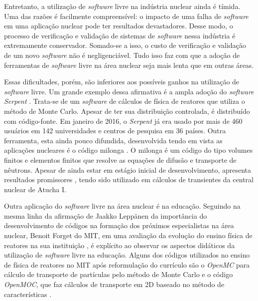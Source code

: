Entretanto, a utilização de \textit{software} livre na indústria nuclear ainda é tímida.
Uma das razões é facilmente compreensível: o impacto de uma falha de \textit{software}
em uma aplicação nuclear pode ter resultados devastadores. Desse modo, o processo de
verificação e validação de sistemas de \textit{software} nessa indústria é extremamente
conservador. Somado-se a isso, o custo de verificação e validação de um novo \textit{software}
não é negligenciável. Tudo isso faz com que a adoção de ferramentas de \textit{software}
livre na área nuclear seja mais lenta que em outras áreas.

Essas dificultades, porém, são inferiores aos possíveis ganhos na utilização de
\textit{software} livre. Um grande exemplo dessa afirmativa é a ampla adoção
do \textit{software Serpent} \cite{Serpent2013}. Trata-se de um \textit{software}
de cálculos de física de reatores que utiliza o método de Monte Carlo. Apesar
de ter sua distribuição controlada, é distribuído com código-fonte. Em janeiro
de 2016, o \textit{Serpent} já era usado por mais de 460 usuários em 142 universidades
e centros de pesquisa em 36 países. Outra ferramenta, esta ainda pouco difundida,
desenvolvida tendo em vista as aplicações nucleares é o código milonga \cite{Theler2015}.
O milonga é um código do tipo volumes finitos e elementos finitos que resolve as equações
de difusão e transporte de nêutrons. Apesar de ainda estar em estágio inicial de
desenvolvimento, apresenta resultados promissores \cite{Theler2014b}, tendo sido
utilizado em cálculos de transientes da central nuclear de Atucha I.

Outra aplicação do \textit{software} livre na área nuclear é na educação. Seguindo na
mesma linha da afirmação de Jaakko Leppänen da importância do desenvolvimento de
códigos na formação dos próximos especialistas na área nuclear\cite{Leppanen2015}, Benoit
Forget do MIT, em uma avaliação da evolução do ensino física de reatores na sua instituição \cite{Forget2014}, é explícito ao observar os aspectos didáticos da
utilização de \textit{software} livre na educação. Alguns dos códigos utilizados
no ensino de física de reatores no MIT após reformulação do currículo são o \textit{OpenMC}
\cite{Romano2013} para cálculo de transporte de partículas pelo método de Monte Carlo e
o código \textit{OpenMOC}, que faz cálculos de transporte em 2D baseado
no método de características \cite{Boyd2014}.



